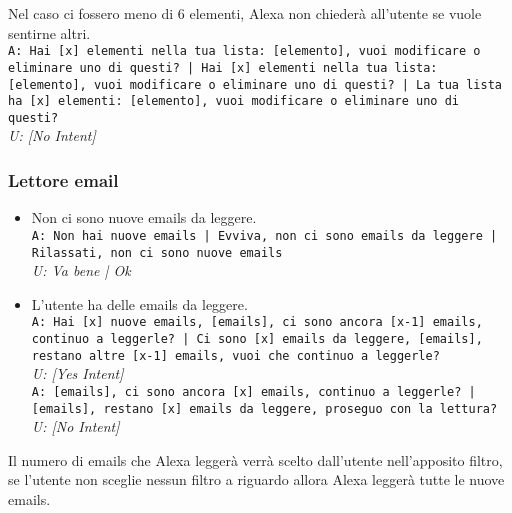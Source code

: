 \begin{itemize}
	Nel caso ci fossero meno di 6 elementi, Alexa non chiederà all'utente se vuole sentirne altri.\\
	\texttt{A: Hai [x] elementi nella tua lista: [elemento], vuoi modificare o eliminare uno di questi? | Hai [x] elementi nella tua lista: [elemento], vuoi modificare o eliminare uno di questi? | La tua lista ha [x] elementi: [elemento], vuoi modificare o eliminare uno di questi? }\\
	\textit{U: [No Intent]}
\end{itemize}

\subsubsection{Lettore email}
\begin{itemize}
	\item Non ci sono nuove emails da leggere. \\
	\texttt{A: Non hai nuove emails | Evviva, non ci sono emails da leggere | Rilassati, non ci sono nuove emails}\\
	\textit{U: Va bene | Ok}
	\item L'utente ha delle emails da leggere. \\
	\texttt{A: Hai [x] nuove emails, [emails], ci sono ancora [x-1] emails, continuo a leggerle? | Ci sono [x] emails da leggere, [emails], restano altre [x-1] emails, vuoi che continuo a leggerle?}\\
	\textit{U: [Yes Intent]}\\
	\texttt{A: [emails], ci sono ancora [x] emails, continuo a leggerle? | [emails], restano [x] emails da leggere, proseguo con la lettura?}\\
	\textit{U: [No Intent]}\\
\end{itemize}
Il numero di emails che Alexa leggerà verrà scelto dall'utente nell'apposito filtro, se l'utente non sceglie nessun filtro a riguardo allora Alexa leggerà tutte le nuove emails.

